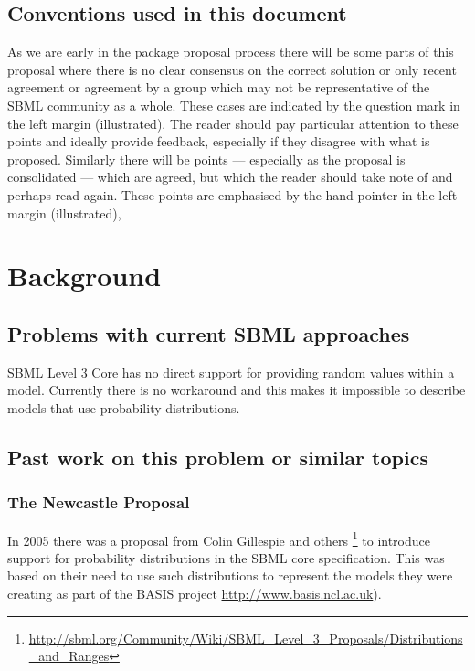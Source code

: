 \documentclass[draftspec]{sbmlpkgspec}
\begin{document}
\subsection{Conventions used in this document}

As we are early in the package proposal process there will be some
parts of this proposal where there is no clear consensus on the
correct solution or only recent agreement or agreement by a group
which may not be representative of the SBML community as a
whole. These cases are indicated by the \contraversial question mark
in the left margin (illustrated). The reader should pay particular
attention to these points and ideally provide feedback, especially if
they disagree with what is proposed. Similarly there will be points
--- especially as the proposal is consolidated --- which are agreed,
but which the reader should take note of and perhaps read again. These
points \watchout are emphasised by the hand pointer in the left margin
(illustrated),

\section{Background}

\subsection{Problems with current SBML approaches}

SBML Level 3 Core has no direct support for providing random values
within a model. Currently there is no workaround and this makes it
impossible to describe models that use probability distributions.

\subsection{Past work on this problem or similar topics}

\subsubsection{The Newcastle Proposal}
\label{sec:newcastle proposal}

In 2005 there was a proposal from Colin Gillespie and others
\footnote{\url{http://sbml.org/Community/Wiki/SBML_Level_3_Proposals/Distributions_and_Ranges}}
to introduce support for probability distributions in the SBML core specification. This
was based on their need to use such distributions to represent the
models they were creating as part of the BASIS project
\url{http://www.basis.ncl.ac.uk}).
\end{document}
